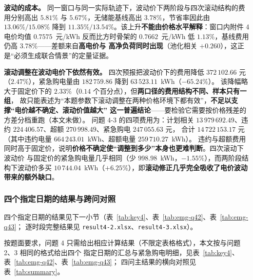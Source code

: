 \textbf{波动的成本。} 同一窗口与同一实际轨迹下，波动价下两阶段与四次滚动结构的费用分别高出
\(5.81\%\) 与 \(5.67\%\)，无储能基线高出 \(3.78\%\)，节省率因此由 \(13.06\%/15.08\%\) 降到
\(11.35\%/13.54\%\)。该上升\textbf{不能由价格水平解释}：窗口内附件 4 电价均值 \(0.7575\)~元/kWh
反而比方时骨架的 \(0.7662\)~元/kWh 低 \(1.13\%\)，基线费用仍高 \(3.78\%\)——差额来自\textbf{高电价与
高净负荷同时出现}（池化相关 \(+0.260\)），这正是“必须生成联合情景”的定量证据。

\textbf{滚动调整在波动电价下依然有效。} 四次预报把波动价下的费用降低 \(372\,102.66\) 元
（\(2.47\%\)），紧急购电量由 \(182\,759.86\) 降到 \(63\,523.11\)~kWh（\(-65.24\%\)）。
该降幅略大于固定价下的 \(2.33\%\)（\(0.14\) 个百分点），但\textbf{两口径的费用结构不同、样本只有一组}，
故只能表述为“本题参数下滚动调整在两种价格环境下都有效”，\textbf{不足以支撑“电价越不确定、滚动价值越大”
这一普遍结论}——要检验它需要按价格残差的方差分档重跑（本文未做）。
问题 4-3 的四项费用为：计划相关
\(13\,979\,692.49\)、违约 \(224\,406.57\)、超额 \(270\,998.49\)、紧急购电 \(247\,055.63\) 元，
合计 \(14\,722\,153.17\) 元（其中违约电量 \(664\,243.01\)~kWh、超额电量 \(259\,710.27\)~kWh）。
违约与超额费用同时高于固定价，说明\textbf{价格不确定使“调整到多少”本身也更难判断}。四次滚动下波动价
与固定价的紧急购电量几乎相同（少 \(998.98\)~kWh，\(-1.55\%\)），而两阶段结构下波动价多买
\(10\,744.04\)~kWh（\(+6.25\%\)），即\textbf{滚动修正几乎完全吸收了电价波动带来的额外缺口}。

\subsubsection{四个指定日期的结果与跨问对照}
四个指定日期的结果见下一小节（表~\ref{tab:key4}、表~\ref{tab:emg-q42}、表~\ref{tab:emg-q43}；
逐时段完整结果见 \texttt{result4-2.xlsx}、\texttt{result4-3.xlsx}）。

按题面要求，问题 4 只需给出相应计算结果（不限定表格格式），本文按与问题 2、3 相同的格式给出四个
指定日期的汇总与紧急购电明细，见表~\ref{tab:key4}、表~\ref{tab:emg-q42}、表~\ref{tab:emg-q43}；
四问主结果的横向对照见表~\ref{tab:summary}。

